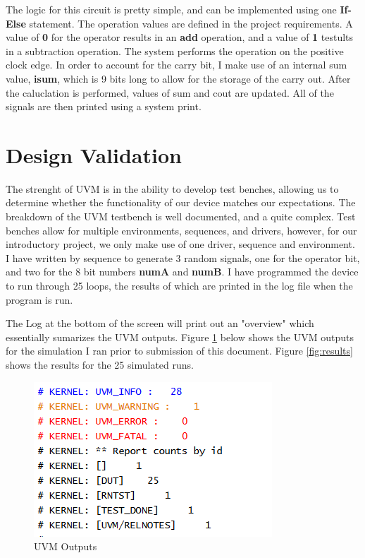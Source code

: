 \documentclass{article}
\begin{document}
The logic for this circuit is pretty simple, and can be implemented using one \textbf{If-Else} statement. The operation values are defined in the project requirements. A value of \textbf{0} for the operator results in an \textbf{add} operation, and a value of \textbf{1} testults in a subtraction operation. The system performs the operation on the positive clock edge. In order to account for the carry bit, I make use of an internal sum value, \textbf{isum}, which is 9 bits long to allow for the storage of the carry out. After the caluclation is performed, values of sum and cout are updated. All of the signals are then printed using a system print.

\section{Design Validation}
The strenght of UVM is in the ability to develop test benches, allowing us to determine whether the functionality of our device matches our expectations. The breakdown of the UVM testbench is well documented, and a quite complex. Test benches allow for multiple environments, sequences, and drivers, however, for our introductory project, we only make use of one driver, sequence and environment. I have written by sequence to generate 3 random signals, one for the operator bit, and two for the 8 bit numbers \textbf{numA} and \textbf{numB}. I have programmed the device to run through 25 loops, the results of which are printed in the log file when the program is run.

The Log at the bottom of the screen will print out an "overview" which essentially sumarizes the UVM outputs. Figure \ref{fig:over} below shows the UVM outputs for the simulation I ran prior to submission of this document. Figure \ref{fig:results} shows the results for the 25 simulated runs. 

\begin{center}
	\begin{figure}[h!]
		\includegraphics{report.png}
		\caption{UVM Outputs}
		\label{fig:over}
	\end{figure}
\end{center}
\end{document}
